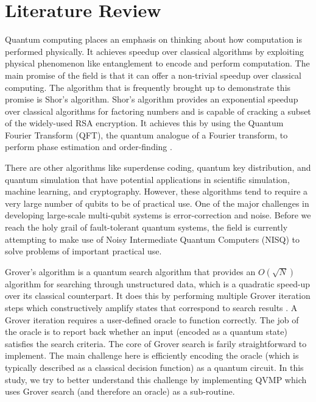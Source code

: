 \documentclass[11pt]{article}
\theoremstyle{definition}
\theoremstyle{remark}
\begin{document}
\section{Literature Review}


Quantum computing places an emphasis on thinking about how computation is
performed physically. It achieves speedup over classical algorithms by
exploiting physical phenomenon like entanglement to encode and perform
computation. The main promise of the field is that it can offer a non-trivial
speedup over classical computing. The algorithm that is frequently brought
up to demonstrate this promise is Shor’s algorithm. Shor’s
algorithm provides an exponential speedup over classical algorithms for
factoring numbers and is capable of cracking a subset of the widely-used RSA
encryption. It achieves this by using the Quantum Fourier Transform (QFT), the
quantum analogue of a Fourier transform, to perform phase estimation and
order-finding \cite{nielsen_quantum_2000}.

There are other algorithms like superdense coding, quantum key
distribution, and quantum simulation that have potential applications in
scientific simulation, machine learning, and cryptography. However, these
algorithms tend to require a very large number of qubits to be of practical use.
One of the major challenges in developing large-scale multi-qubit systems is
error-correction and noise. Before we reach the holy grail of  fault-tolerant
quantum systems, the field is currently attempting to make use of Noisy
Intermediate Quantum Computers (NISQ) to solve problems of important practical
use.

Grover's algorithm is a quantum search algorithm that provides an $O(\sqrt{N})$
algorithm for searching through unstructured data, which is a quadratic speed-up
over its classical counterpart. It does this by performing multiple Grover
iteration steps which constructively amplify states that correspond to search
results \cite{nielsen_quantum_2000}. A Grover iteration requires a user-defined
oracle to function correctly. The job of the oracle is to report back whether an
input (encoded as a quantum state) satisfies the search criteria. The core of
Grover search is farily straightforward to implement. The main challenge
here is efficiently encoding the oracle (which is typically described as
a classical decision function) as a quantum circuit. In this study, we try to
better understand this challenge by implementing QVMP which uses Grover search
(and therefore an oracle) as a sub-routine.
\end{document}
